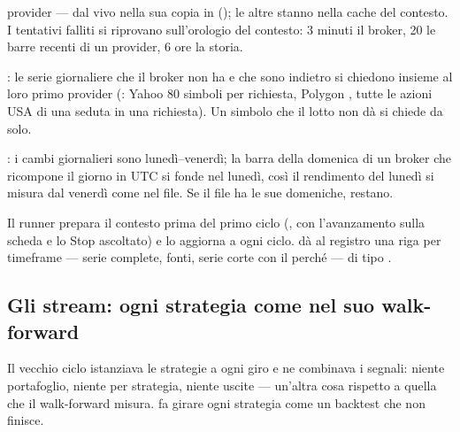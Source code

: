 \begin{description}[leftmargin = 1.4em, style = nextline, itemsep = 4pt]
    provider --- dal vivo nella sua copia in 
    (); le altre stanno nella cache del contesto. I tentativi falliti
    si riprovano sull'orologio del contesto: \num{3} minuti il broker,
    \num{20} le barre recenti di un provider, \num{6} ore la storia.
  \item[A lotti] : le serie giornaliere che il
    broker non ha e che sono indietro si chiedono insieme al loro primo
    provider (: Yahoo \num{80} simboli per richiesta,
    Polygon , tutte le azioni USA di una seduta in una
    richiesta). Un simbolo che il lotto non dà si chiede da solo.
  \item[Il calendario] : i cambi
    giornalieri sono lunedì--venerdì; la barra della domenica di un broker
    che ricompone il giorno in UTC si fonde nel lunedì, così il rendimento
    del lunedì si misura dal venerdì come nel file. Se il file ha le sue
    domeniche, restano.
\end{description}

\noindent
Il runner prepara il contesto prima del primo ciclo
(, con l'avanzamento sulla scheda e lo Stop
ascoltato) e lo aggiorna a ogni ciclo.  dà al registro
una riga per timeframe --- serie complete, fonti, serie corte con il
perché --- di tipo .

\subsection{Gli stream: ogni strategia come nel suo walk-forward}\label{sez:live-stream}

Il vecchio ciclo istanziava le strategie a ogni giro e ne combinava i
segnali: niente portafoglio, niente  per strategia,
niente uscite --- un'altra cosa rispetto a quella che il walk-forward misura.
 fa girare ogni strategia come un backtest che non
finisce.

